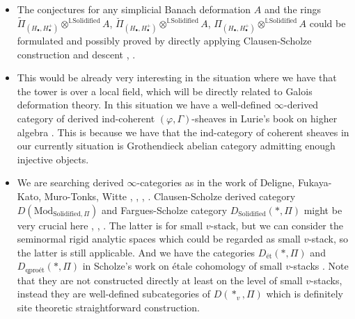 \documentclass[11pt]{report}
\begin{document}



\begin{itemize}
\justifying
\item<7-> The conjectures for any simplicial Banach deformation $A$ and the rings $\widetilde{\Pi}_{(H_\bullet,H_\bullet^+)}\otimes^{\mathbb{L}\mathrm{Solidified}} A$, $\breve{\Pi}_{(H_\bullet,H_\bullet^+)}\otimes^{\mathbb{L}\mathrm{Solidified}} A$, ${\Pi}_{(H_\bullet,H_\bullet^+)}\otimes^{\mathbb{L}\mathrm{Solidified}} A$ could be formulated and possibly proved by directly applying Clausen-Scholze construction and descent \cite{CS1}, \cite{CS2}.  

\item<8-> This would be already very interesting in the situation where we have that the tower is over a local field, which will be directly related to Galois deformation theory. In this situation we have a well-defined $\infty$-derived category of derived ind-coherent $(\varphi,\Gamma)$-sheaves in Lurie's book on higher algebra \cite{Lu1}. This is because we have that the ind-category of coherent sheaves in our currently situation is Grothendieck abelian category admitting enough injective objects.


\item<9-> We are searching derived $\infty$-categories as in the work of Deligne, Fukaya-Kato, Muro-Tonks, Witte \cite{De3}, \cite{FK}, \cite{MT}, \cite{Wit1}. Clausen-Scholze derived category $D(\mathrm{Mod}_{\mathrm{Solidified},\Pi})$ and Fargues-Scholze category $D_\mathrm{Solidified}(*,\Pi)$ might be very crucial here \cite{CS1}, \cite{CS2}, \cite{FS}. The latter is for small $v$-stack, but we can consider the seminormal rigid analytic spaces which could be regarded as small $v$-stack, so the latter is still applicable. And we have the categories $D_\text{\'et}(*,\Pi)$ and $D_\text{qpro\'et}(*,\Pi)$ in Scholze's work on \'etale cohomology of small $v$-stacks \cite{3Sch3}. Note that they are not constructed directly at least on the level of small $v$-stacks, instead they are well-defined subcategories of $D(*_v,\Pi)$ which is definitely site theoretic straightforward construction.


 
\end{itemize}






\newpage
\end{document}

